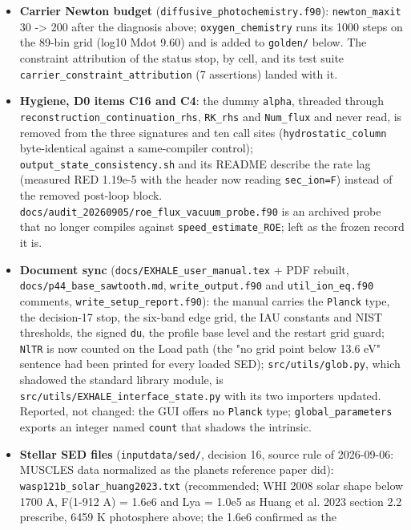 \documentclass[english,a4paper]{my_memo}
\begin{document}
\begin{itemize}
\item
  \textbf{Carrier Newton budget} (\texttt{diffusive\_photochemistry.f90}): \texttt{newton\_maxit}
  30 -\textgreater{} 200 after the diagnosis above; \texttt{oxygen\_chemistry} runs its 1000
  steps on the 89-bin grid (log10 Mdot 9.60) and is added to \texttt{golden/}
  below. The constraint attribution of the status stop, by cell, and its
  test suite \texttt{carrier\_constraint\_attribution} (7 assertions) landed with it.
\item
  \textbf{Hygiene, D0 items C16 and C4}: the dummy \texttt{alpha}, threaded through
  \texttt{reconstruction\_continuation\_rhs}, \texttt{RK\_rhs} and \texttt{Num\_flux} and never read,
  is removed from the three signatures and ten call sites
  (\texttt{hydrostatic\_column} byte-identical against a same-compiler control);
  \texttt{output\_state\_consistency.sh} and its README describe the rate lag
  (measured RED 1.19e-5 with the header now reading \texttt{sec\_ion=F}) instead of
  the removed post-loop block. \texttt{docs/audit\_20260905/roe\_flux\_vacuum\_probe.f90}
  is an archived probe that no longer compiles against
  \texttt{speed\_estimate\_ROE}; left as the frozen record it is.
\item
  \textbf{Document sync} (\texttt{docs/EXHALE\_user\_manual.tex} + PDF rebuilt,
  \texttt{docs/p44\_base\_sawtooth.md}, \texttt{write\_output.f90} and \texttt{util\_ion\_eq.f90}
  comments, \texttt{write\_setup\_report.f90}): the manual carries the \texttt{Planck}
  type, the decision-17 stop, the six-band edge grid, the IAU constants and
  NIST thresholds, the signed \texttt{du}, the profile base level and the restart
  grid guard; \texttt{NlTR} is now counted on the Load path (the "no grid point
  below 13.6 eV" sentence had been printed for every loaded SED);
  \texttt{src/utils/glob.py}, which shadowed the standard library module, is
  \texttt{src/utils/EXHALE\_interface\_state.py} with its two importers updated.
  Reported, not changed: the GUI offers no \texttt{Planck} type; \texttt{global\_parameters}
  exports an integer named \texttt{count} that shadows the intrinsic.
\item
  \textbf{Stellar SED files} (\texttt{inputdata/sed/}, decision 16, source rule of
  2026-09-06: MUSCLES data normalized as the planet\textquotesingle s reference paper did):
  \texttt{wasp121b\_solar\_huang2023.txt} (recommended; WHI 2008 solar shape below
  1700 A, F(1-912 A) = 1.6e6 and Lya = 1.0e5 as Huang et al. 2023 section
  2.2 prescribe, 6459 K photosphere above; the 1.6e6 confirmed as the

\end{itemize}
\end{document}
